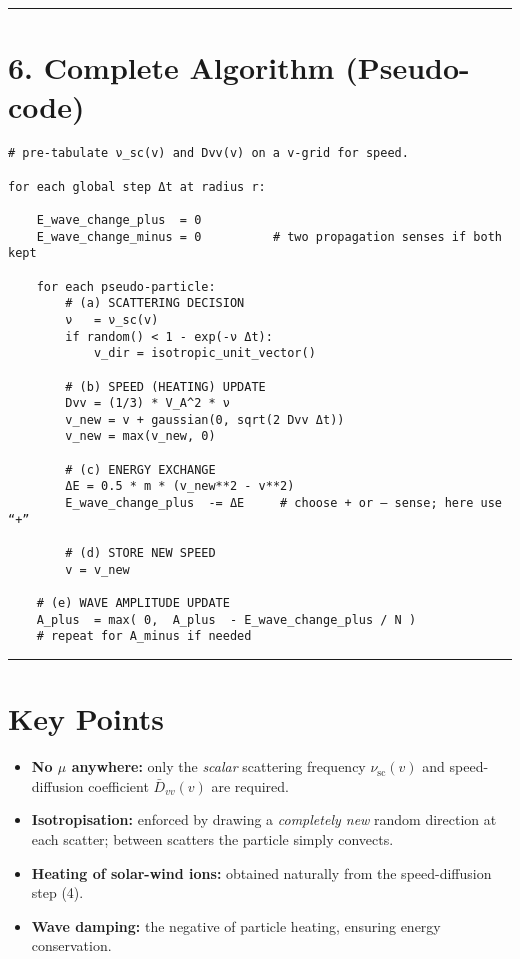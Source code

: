 \bigskip
\hrule
\bigskip

\section*{6. Complete Algorithm (Pseudo-code)}

\begin{lstlisting}[mathescape=true]
# pre-tabulate ν_sc(v) and Dvv(v) on a v-grid for speed.

for each global step Δt at radius r:

    E_wave_change_plus  = 0
    E_wave_change_minus = 0          # two propagation senses if both kept

    for each pseudo-particle:
        # (a) SCATTERING DECISION
        ν   = ν_sc(v)
        if random() < 1 - exp(-ν Δt):
            v_dir = isotropic_unit_vector()

        # (b) SPEED (HEATING) UPDATE
        Dvv = (1/3) * V_A^2 * ν
        v_new = v + gaussian(0, sqrt(2 Dvv Δt))
        v_new = max(v_new, 0)

        # (c) ENERGY EXCHANGE
        ΔE = 0.5 * m * (v_new**2 - v**2)
        E_wave_change_plus  -= ΔE     # choose + or – sense; here use “+”
        
        # (d) STORE NEW SPEED
        v = v_new

    # (e) WAVE AMPLITUDE UPDATE
    A_plus  = max( 0,  A_plus  - E_wave_change_plus / N )
    # repeat for A_minus if needed
\end{lstlisting}

\bigskip
\hrule
\bigskip

\section*{Key Points}
\begin{itemize}
    \item \textbf{No \( \mu \) anywhere:} only the \emph{scalar} scattering frequency \( \nu_{\text{sc}}(v) \) and speed-diffusion coefficient \( \bar{D}_{vv}(v) \) are required.
    \item \textbf{Isotropisation:} enforced by drawing a \emph{completely new} random direction at each scatter; between scatters the particle simply convects.
    \item \textbf{Heating of solar-wind ions:} obtained naturally from the speed-diffusion step (4).
    \item \textbf{Wave damping:} the negative of particle heating, ensuring energy conservation.
\end{itemize}




